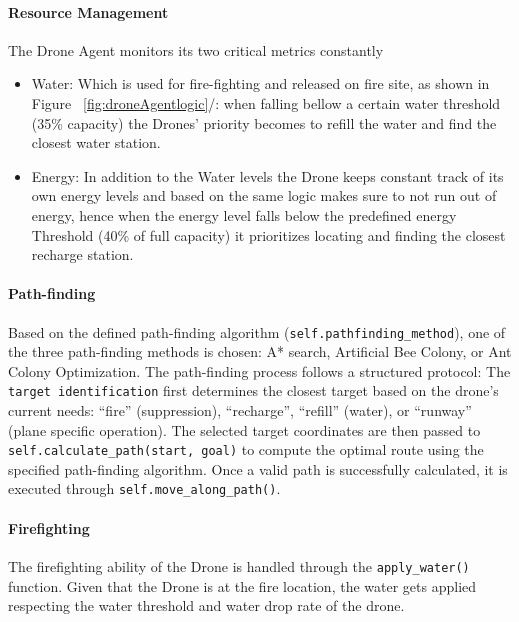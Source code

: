 \documentclass[11pt, a4paper]{article}
\begin{document}
\paragraph{Resource Management} The Drone Agent monitors its two critical metrics constantly
\begin{itemize}
  \item {Water:} Which is used for fire-fighting and released on fire site, as shown in Figure ~\ref{fig:droneAgentlogic}/: when falling bellow a certain water threshold (35\% capacity) the Drones' priority becomes to refill the water and find the closest water station.
  \item {Energy:} In addition to the Water levels the Drone keeps constant track of its own energy levels and based on the same logic makes sure to not run out of energy, hence when the energy level falls below the predefined energy Threshold (40\% of full capacity) it prioritizes locating and finding the closest recharge station.
\end{itemize}


\paragraph{Path-finding} Based on the defined path-finding algorithm (\texttt{self.pathfinding\_method}), one of the three path-finding methods is chosen: A* search, Artificial Bee Colony, or Ant Colony Optimization. The path-finding process follows a structured protocol: The \texttt{target identification} first determines the closest target based on the drone's current needs: ``fire'' (suppression), ``recharge'', ``refill'' (water), or ``runway'' (plane specific operation). The selected target coordinates are then passed to \texttt{self.calculate\_path(start, goal)} to compute the optimal route using the specified path-finding algorithm. Once a valid path is successfully calculated, it is executed through \texttt{self.move\_along\_path()}.

\paragraph{Firefighting} The firefighting ability of the Drone is handled through the \texttt{apply\_water()} function. Given that the Drone is at the fire location, the water gets applied respecting the water threshold and water drop rate of the drone.
\end{document}
